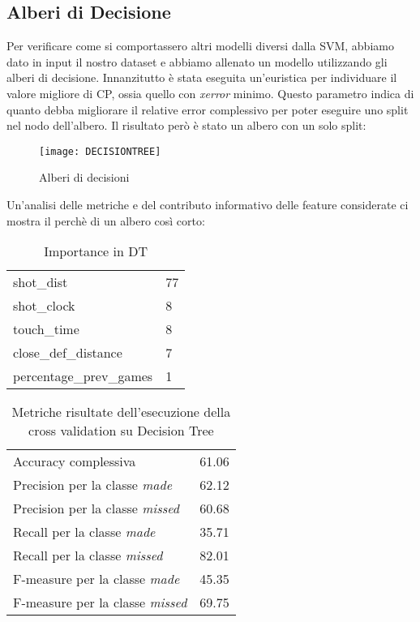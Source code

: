 \pagebreak
\subsection{Alberi di Decisione}
Per verificare come si comportassero altri modelli diversi dalla SVM, abbiamo dato in input il nostro dataset e abbiamo allenato un modello utilizzando gli alberi di decisione.
Innanzitutto è stata eseguita un'euristica per individuare il valore migliore di CP, ossia quello con \textit{xerror} minimo. Questo parametro indica di quanto debba migliorare il relative error complessivo per poter eseguire uno split nel nodo dell'albero.
Il risultato però è stato un albero con un solo split:

\begin{figure}[H]
\caption{Alberi di decisioni}
\label{dt_fig}
  \texttt{[image: DECISIONTREE]}
\end{figure}


Un'analisi delle metriche e del contributo informativo delle feature considerate ci mostra il perchè di un albero così corto:
\begin{table}[H]
\centering
  \begin{tabular}{l l} 
shot\_dist &77\\
shot\_clock &8\\
touch\_time &8\\
close\_def\_distance &7\\
percentage\_prev\_games &1\\
    \end{tabular}
    \caption{Importance in DT}
\end{table}

\begin{table}[h!]
\centering
  \begin{tabular}{l l} 
  Accuracy complessiva & 61.06\\
  Precision per la classe \textit{made} & 62.12\\
  Precision per la classe \textit{missed} & 60.68\\
  Recall per la classe \textit{made} & 35.71\\
  Recall per la classe \textit{missed} & 82.01\\
  F-measure per la classe \textit{made} & 45.35\\
  F-measure per la classe \textit{missed} & 69.75\\
    \end{tabular}
    \caption{Metriche risultate dell'esecuzione della cross validation su Decision Tree}
\end{table}

